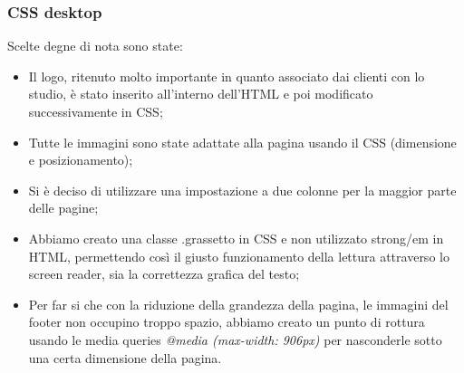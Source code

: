 \subsubsection{CSS desktop}
\label{frontend:css}
Scelte degne di nota sono state:
\begin{itemize}
\item Il logo, ritenuto molto importante in quanto associato dai clienti con lo studio, è stato inserito all’interno dell’HTML e poi modificato successivamente in CSS;
\item Tutte le immagini sono state adattate alla pagina usando il CSS (dimensione e posizionamento);
\item Si è deciso di utilizzare una impostazione a due colonne per la maggior parte delle pagine;
\item Abbiamo creato una classe .grassetto in CSS e non utilizzato strong/em in HTML, permettendo così il giusto funzionamento della lettura attraverso lo screen reader, sia la correttezza grafica del testo;
\item Per far si che con la riduzione della grandezza della pagina, le immagini del footer non occupino troppo spazio, abbiamo creato un punto di rottura usando le media queries \textit{@media (max-width: 906px)} per nasconderle sotto una certa dimensione della pagina.
\end{itemize}

